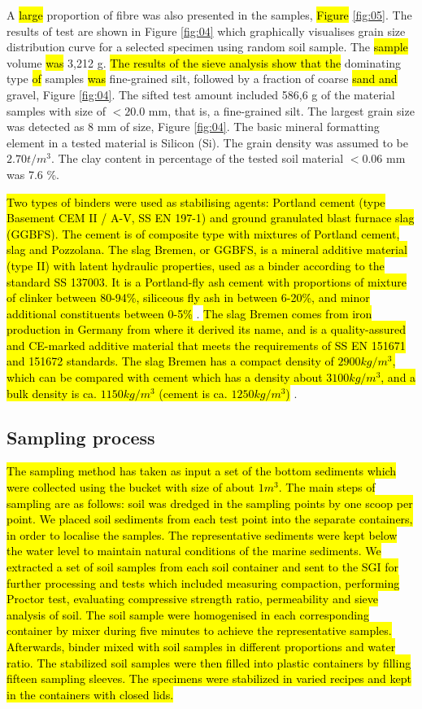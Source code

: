 \documentclass{amestyle}
\begin{document}
A \hl{large} proportion of fibre was also presented in the samples, \hl{Figure} \ref{fig:05}. The results of test are shown in Figure \ref{fig:04} which graphically visualises grain size distribution curve for a selected specimen using random soil sample. The \hl{sample} volume \hl{was} 3,212 g. 
\hl{The results of the sieve analysis show that the} dominating type \hl{of} samples \hl{was }fine-grained silt, followed by a fraction of coarse \hl{sand and} gravel, Figure \ref{fig:04}. The sifted test amount included 586,6 g of the material samples with size of $<20.0$ mm, that is, a fine-grained silt. The largest grain size was detected as 8 mm of size, Figure \ref{fig:04}. The basic mineral formatting element in a tested material is Silicon (Si). The grain density was assumed to be $2.70t/m^3$. The clay content in percentage of the tested soil material $<0.06$ mm was 7.6 \%. 

\hl{Two types of binders were used as stabilising agents: Portland cement (type Basement CEM II / A-V, SS EN 197-1) and ground granulated blast furnace slag (GGBFS). The cement is of composite type with mixtures of Portland cement, slag and Pozzolana. The slag Bremen, or GGBFS, is a mineral additive material (type II) with latent hydraulic properties, used as a binder according to the standard SS 137003. It is a Portland-fly ash cement with proportions of mixture of clinker between 80-94\%, siliceous fly ash in between 6-20\%, and minor additional constituents between 0-5\%} \cite{BSI}. \hl{The slag Bremen comes from iron production in Germany from where it derived its name, and is a quality-assured and CE-marked additive material that meets the requirements of SS EN 151671 and 151672 standards. The slag Bremen has a compact density of $2900 kg/m^3$, which can be compared with cement which has a density about $3100 kg/m^3$, and a bulk density is ca. $1150 kg/m^3$ (cement is ca. $1250 kg/m^3$)} \cite{ThomasCement}. 

\subsection{Sampling process}
\hl{The sampling method has taken as input a set of the bottom sediments which were collected using the bucket with size of about $1 m^3$. The main steps of sampling are as follows: soil was dredged in the sampling points by one scoop per point. We placed soil sediments from each test point into the separate containers, in order to localise the samples. The representative sediments were kept below the water level to maintain natural conditions of the marine sediments. We extracted a set of soil samples from each soil container and sent to the SGI for further processing and tests which included measuring compaction, performing Proctor test, evaluating compressive strength ratio, permeability and sieve analysis of soil. The soil sample were homogenised in each corresponding container by mixer during five minutes to achieve the representative samples. Afterwards, binder mixed with soil samples in different proportions and water ratio. The stabilized soil samples were then filled into plastic containers by filling fifteen sampling sleeves. The specimens were stabilized in varied recipes and kept in the containers with closed lids.}
\end{document}
